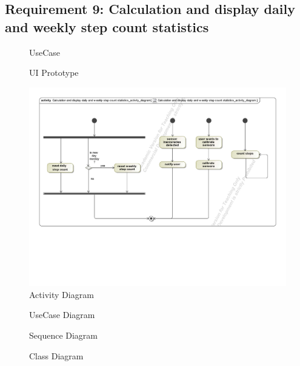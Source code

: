 \documentclass{article}
\begin{document}
	\subsection{Requirement 9: Calculation and display daily and weekly step count statistics}
		\begin{figure}[h!]
			\centering
			\captionsetup{labelformat=empty}
			\caption{UseCase}
		\end{figure}
		\newpage
		\begin{figure}[h!]
			\centering
			\captionsetup{labelformat=empty}
			\caption{UI Prototype}
		\end{figure}
		\newpage
		\begin{figure}[h!]
		    \centering
		    \captionsetup{labelformat=empty}
		    \caption{Activity Diagram}
		    \includegraphics[width=\textwidth, angle=0]{Marc/req9/9activity.pdf}
		\end{figure}
		\newpage
		\begin{figure}[h!]
			\centering
			\captionsetup{labelformat=empty}
			\caption{UseCase Diagram}
		\end{figure}
		\newpage
		\begin{figure}[h!]
			\centering
			\captionsetup{labelformat=empty}
			\caption{Sequence Diagram}
		\end{figure}
		\newpage
		\begin{figure}[h!]
			\centering
			\captionsetup{labelformat=empty}
			\caption{Class Diagram}
		\end{figure}
		\newpage
\end{document}
